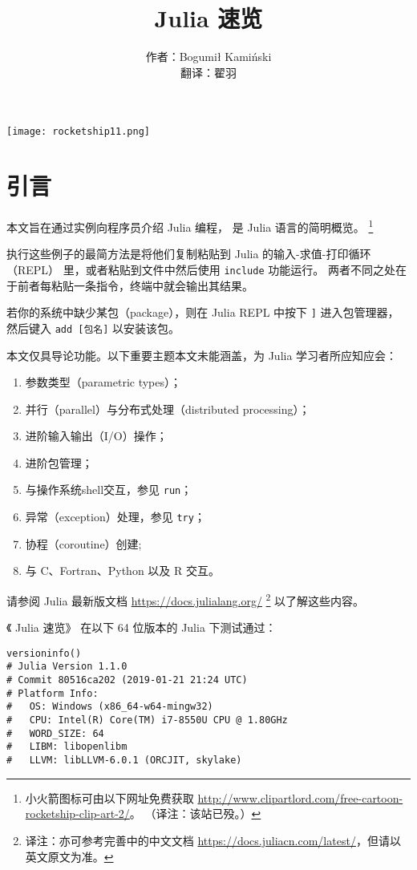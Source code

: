 \documentclass[10pt,a4paper]{article}
\begin{document}
\title{Julia 速览}
\author{作者：Bogumi\l{} Kami\'n{}ski\\翻译：翟羽}
\maketitle

{\centering
\texttt{[image: rocketship11.png]}\par
}

\tableofcontents

\section{引言}
本文旨在通过实例向程序员介绍 Julia 编程，
是 Julia 语言的简明概览。
\footnote{小火箭图标可由以下网址免费获取  \url{http://www.clipartlord.com/free-cartoon-rocketship-clip-art-2/}。
（译注：该站已殁。）}

执行这些例子的最简方法是将他们复制粘贴到 Julia 的输入-求值-打印循环（REPL） 里，或者粘贴到文件中然后使用 \lstinline|include| 功能运行。
两者不同之处在于前者每粘贴一条指令，终端中就会输出其结果。

若你的系统中缺少某包（package），则在 Julia REPL 中按下 \lstinline|]| 进入包管理器，
然后键入 \lstinline|add [包名]| 以安装该包。

本文仅具导论功能。以下重要主题本文未能涵盖，为 Julia 学习者所应知应会：
\begin{enumerate}[label=\arabic*),nolistsep]
  \item 参数类型（parametric types）；
  \item 并行（parallel）与分布式处理（distributed processing）；
  \item 进阶输入输出（I/O）操作；
  \item 进阶包管理；
  \item 与操作系统shell交互，参见 \lstinline|run|；
  \item 异常（exception）处理，参见 \lstinline|try|；
  \item 协程（coroutine）创建;
  \item 与 C、Fortran、Python 以及 R 交互。
\end{enumerate}
请参阅 Julia 最新版文档 \url{https://docs.julialang.org/} 
\footnote{译注：亦可参考完善中的中文文档 \url{https://docs.juliacn.com/latest/}，但请以英文原文为准。} 以了解这些内容。

《 Julia 速览》 在以下 64 位版本的 Julia 下测试通过：
\begin{lstlisting}
versioninfo()
# Julia Version 1.1.0
# Commit 80516ca202 (2019-01-21 21:24 UTC)
# Platform Info:
#   OS: Windows (x86_64-w64-mingw32)
#   CPU: Intel(R) Core(TM) i7-8550U CPU @ 1.80GHz
#   WORD_SIZE: 64
#   LIBM: libopenlibm
#   LLVM: libLLVM-6.0.1 (ORCJIT, skylake)
\end{lstlisting}
\end{document}

